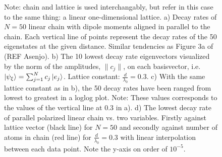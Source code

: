 \documentclass{article}
\begin{document}
\begin{figure}[H]
    \caption{Note: chain and lattice is used interchangably, but refer in this case to the same thing: a linear one-dimensional lattice. a) Decay rates of $N=50$ linear chain with dipole moments aligned in parallel to the chain. Each vertical line of points represent the decay rates of the 50 eigenstates at the given distance. Similar tendencies as Figure 3a of (REF Asenjo). b) The 10 lowest decay rate eigenvectors visualized by the norm of the amplitudes, $\| c_j \|$, on each basisvector, i.e. $\ket{\psi_\xi} = \sum_{j=1}^N c_j \ket{e_j}$. Lattice constant: $\frac{d}{\lambda_0} = 0.3$. c) With the same lattice constant as in b), the 50 decay rates have been ranged from lowest to greatest in a loglog plot. Note: These values corresponds to the values of the vertical line at 0.3 in a). d) The lowest decay rate of parallel polarized linear chain vs. two variables. Firstly against lattice vector (black line) for $N=50$ and secondly against number of atoms in chain (red line) for $\frac{d}{\lambda_0} = 0.3$ with linear interpolation between each data point. Note the y-axis on order of $10^{-5}$. }
    \label{fig:fig1}
\end{figure}
\end{document}
